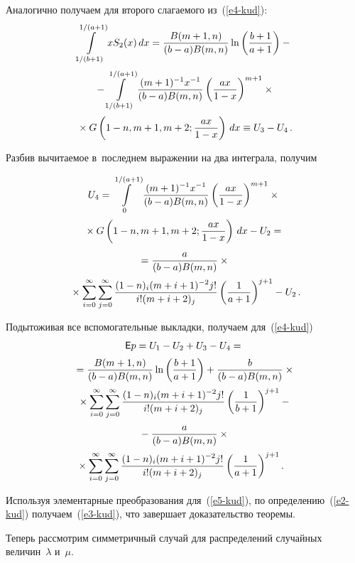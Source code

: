 \begin{multicols}{2}
Аналогично получаем для второго слагаемого из~(\ref{e4-kud}):
\begin{multline*}
\int\limits_{1/(b+1)}^{1/(a+1)} xS_{2}(x)\, dx =
\displaystyle\frac{\displaystyle  B(m+1, n)\mathstrut}{\displaystyle (b-a) B(m,n)\mathstrut}\ln\left( \displaystyle\frac{\displaystyle  b+1\mathstrut}{\displaystyle a+1\mathstrut} \right)-{}\\[2pt]
{}- \int\limits_{1/(b+1)}^{1/(a+1)} \displaystyle\frac{\displaystyle (m+1)^{-1}x^{-1}\mathstrut}{\displaystyle (b-a)B(m,n)\mathstrut} \left(
\displaystyle\frac{\displaystyle ax\mathstrut}{\displaystyle 1-x\mathstrut} \right)^{m+1}\times{}\\[2pt]
{}\times G\left(
1-n,m+1,m+2; \displaystyle\frac{\displaystyle ax\mathstrut}{\displaystyle 1-x\mathstrut}  \right)\,dx\equiv U_3-U_4\,.
\end{multline*}

Разбив вычитаемое в~последнем выражении на два интеграла, получим

\noindent
\begin{multline*}
U_4= \int\limits_{0}^{1/(a+1)} \displaystyle\frac{\displaystyle (m+1)^{-1}x^{-1}\mathstrut}{\displaystyle (b-a)B(m,n)\mathstrut} \left(
\displaystyle\frac{\displaystyle ax\mathstrut}{\displaystyle 1-x\mathstrut} \right)^{m+1}\times{}\\[2pt]
{}\times G\left(1-n,m+1,m+2; \displaystyle\frac{\displaystyle ax\mathstrut}{\displaystyle 1-x\mathstrut}  \right)\,dx-U_2={}\\[2pt]
{} = \displaystyle\frac{\displaystyle a\mathstrut}{\displaystyle (b-a)B(m,n)\mathstrut}\times{}\\[2pt]
{}\times \sum\limits_{i=0}^{\infty}\sum\limits_{j=0}^{\infty}
\displaystyle\frac{\displaystyle (1-n)_i(m+i+1)^{-2}j!\mathstrut}{\displaystyle  i!(m+i+2)_{j}\mathstrut} \left( \displaystyle\frac{\displaystyle 1\mathstrut}{\displaystyle a+1\mathstrut}
\right)^{j+1}-U_2\,.\hspace*{-2.3764pt}
\end{multline*}

Подытоживая все вспомогательные выкладки, получаем для~(\ref{e4-kud})
\begin{multline}
{\sf E} p=U_1-U_2+U_3-U_4={}\\[2pt]
{}=
\fr{ B(m+1, n)}{(b-a) B(m,n)}\ln\left(
\fr{ b+1}{a+1} \right)+ \fr{b}{(b-a)B(m,n)}\times{}\\[2pt]
{}\times \sum\limits_{i=0}^{\infty}\sum\limits_{j=0}^{\infty}
\fr{(1-n)_i(m+i+1)^{-2}j!}{i!(m+i+2)_{j}} \left( \fr{1}{b+1} \right)^{j+1}-{}\\
{} -\fr{a}{(b-a)B(m,n)} \times{}\\[2pt]
\hspace*{-3mm}{}\times\sum\limits_{i=0}^{\infty}\sum\limits_{j=0}^{\infty}
\fr{(1-n)_i(m+i+1)^{-2}j!}{ i!(m+i+2)_{j}} \left( \fr{1}{a+1}
\right)^{j+1}.\label{e5-kud}
\end{multline}

Используя элементарные преобразования для~(\ref{e5-kud}), по определению~(\ref{e2-kud})
получаем~(\ref{e3-kud}), что завершает доказательство теоремы.

\smallskip

Теперь рассмотрим симметричный случай для распределений случайных величин~$\lambda$
и~$\mu$.


\end{multicols}
